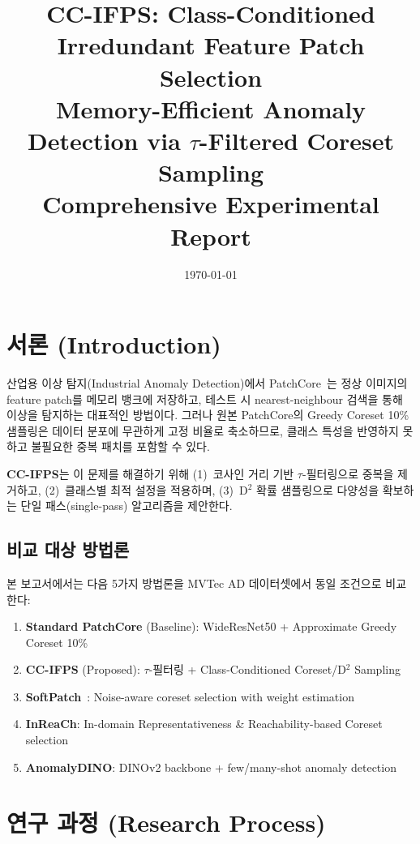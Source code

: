 \documentclass[11pt,a4paper]{article}
\title{%
  \textbf{CC-IFPS: Class-Conditioned Irredundant Feature Patch Selection}\\
  \large{Memory-Efficient Anomaly Detection via $\tau$-Filtered Coreset Sampling}\\[6pt]
  \normalsize{Comprehensive Experimental Report}
}
\author{}
\date{\today}
\begin{document}
\maketitle
\tableofcontents
\newpage

\section{서론 (Introduction)}

산업용 이상 탐지(Industrial Anomaly Detection)에서 PatchCore~\cite{roth2022patchcore}는 정상 이미지의 feature patch를 메모리 뱅크에 저장하고, 테스트 시 nearest-neighbour 검색을 통해 이상을 탐지하는 대표적인 방법이다.
그러나 원본 PatchCore의 Greedy Coreset 10\% 샘플링은 데이터 분포에 무관하게 고정 비율로 축소하므로, 클래스 특성을 반영하지 못하고 불필요한 중복 패치를 포함할 수 있다.

\textbf{CC-IFPS}는 이 문제를 해결하기 위해 (1)~코사인 거리 기반 $\tau$-필터링으로 중복을 제거하고, (2)~클래스별 최적 설정을 적용하며, (3)~D$^2$ 확률 샘플링으로 다양성을 확보하는 단일 패스(single-pass) 알고리즘을 제안한다.

\subsection{비교 대상 방법론}

본 보고서에서는 다음 5가지 방법론을 MVTec AD 데이터셋에서 동일 조건으로 비교한다:

\begin{enumerate}
  \item \textbf{Standard PatchCore} (Baseline): WideResNet50 + Approximate Greedy Coreset 10\%
  \item \textbf{CC-IFPS} (Proposed): $\tau$-필터링 + Class-Conditioned Coreset/D$^2$ Sampling
  \item \textbf{SoftPatch}~\cite{xi2022softpatch}: Noise-aware coreset selection with weight estimation
  \item \textbf{InReaCh}: In-domain Representativeness \& Reachability-based Coreset selection
  \item \textbf{AnomalyDINO}: DINOv2 backbone + few/many-shot anomaly detection
\end{enumerate}


\section{연구 과정 (Research Process)}
\end{document}
